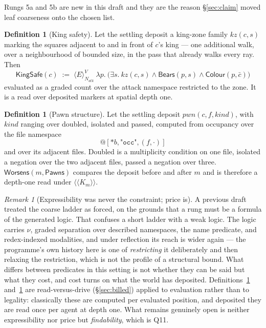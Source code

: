 \documentclass[11pt,a4paper]{article}
\makeatletter
\theoremstyle{plain}
\theoremstyle{definition}
\newtheorem{definition}[theorem]{Definition}
\theoremstyle{remark}
\newtheorem{remark}[theorem]{Remark}
\newcommand{\qt}[1]{\ensuremath{@#1}}
\newcommand{\KKmod}[1]{\langle\!\langle K_{#1}\rangle\!\rangle}
\newcommand{\Emod}[2]{\langle E\rangle^{#2}_{#1}}
\makeatother
\begin{document}
Rungs 5a and 5b are new in this draft and they are the reason
\S\ref{sec:claim} moved leaf coarseness onto the chosen list.

\begin{definition}[King safety]
\label{def:kingsafe}
Let the settling deposit a king-zone family $\mathit{kz}(c,s)$ marking the
squares adjacent to and in front of $c$'s king --- one additional walk, over a
neighbourhood of bounded size, in the pass that already walks every ray. Then
\[
  \mathsf{KingSafe}(c) \;:=\;
  \Emod{N_{\mathit{atk}}}{V}\ \lambda p.\
  \big(\exists s.\ \mathit{kz}(c,s) \wedge \mathsf{Bears}(p,s)
       \wedge \mathsf{Colour}(p,\bar c)\big)
\]
evaluated as a graded count over the attack namespace restricted to the zone. It
is a read over deposited markers at spatial depth one.
\end{definition}

\begin{definition}[Pawn structure]
\label{def:pawns}
Let the settling deposit $\mathit{pwn}(c,f,\mathit{kind})$, with
$\mathit{kind}$ ranging over doubled, isolated and passed, computed from
occupancy over the file namespace
\[
  \qt{[*b,\texttt{"occ"},(f,\cdot)]}
\]
and over its adjacent files. Doubled is a multiplicity condition on one file,
isolated a negation over the two adjacent files, passed a negation over three.
$\mathsf{Worsens}(m,\mathsf{Pawns})$ compares the deposit before and after $m$
and is therefore a depth-one read under $\KKmod{m}$.
\end{definition}

\begin{remark}[Expressibility was never the constraint; price is]
\label{rem:express}
A previous draft treated the coarse ladder as forced, on the grounds that a rung
must be a formula of the generated logic. That confuses a short ladder with a
weak logic. The logic carries $\nu$, graded separation over described
namespaces, the name predicate, and redex-indexed modalities, and under
reflection its reach is wider again --- the programme's own history here is one
of \emph{restricting} it deliberately and then relaxing the restriction, which
is not the profile of a structural bound. What differs between predicates in
this setting is not whether they can be said but what they cost, and cost turns
on what the world has deposited. Definitions~\ref{def:kingsafe}
and~\ref{def:pawns} are read-versus-drive (\S\ref{sec:billed}) applied to
evaluation rather than to legality: classically these are computed per evaluated
position, and deposited they are read once per agent at depth one. What remains
genuinely open is neither expressibility nor price but \emph{findability}, which
is Q11.
\end{remark}
\end{document}
